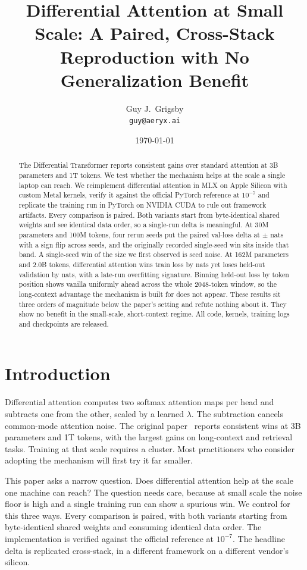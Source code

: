 \documentclass[11pt]{article}
\title{Differential Attention at Small Scale: A Paired, Cross-Stack
Reproduction with No Generalization Benefit}
\author{Guy J.\ Grigsby\\\small\texttt{guy@aeryx.ai}}
\date{\today}
\begin{document}
\maketitle

\begin{abstract}
The Differential Transformer reports consistent gains over standard
attention at 3B parameters and 1T tokens. We test whether the mechanism
helps at the scale a single laptop can reach. We reimplement
differential attention in MLX on Apple Silicon with custom Metal
kernels, verify it against the official PyTorch reference at $10^{-7}$ 
and replicate the training run in PyTorch on NVIDIA CUDA to rule out
framework artifacts. Every comparison is paired. Both variants start
from byte-identical shared weights and see identical data order, so a
single-run delta is meaningful. At 30M parameters and 100M tokens, four
rerun seeds put the paired val-loss delta at \StageZeroMeanDelta{}
$\pm$ \StageZeroStdDelta{} nats with a sign flip across seeds, and the
originally recorded single-seed win sits inside that band. A
single-seed win of the size we first observed is seed noise. At 162M
parameters and 2.0B tokens, differential attention wins train loss by
\StageOneTrainDeltaSigned{} nats yet loses held-out validation by
\StageOneValDeltaSigned{} nats, with a late-run overfitting signature.
Binning held-out loss by token position shows vanilla uniformly ahead
across the whole 2048-token window, so the long-context advantage the
mechanism is built for does not appear. These results sit three orders
of magnitude below the paper's setting and refute nothing about it.
They show no benefit in the small-scale, short-context regime. All
code, kernels, training logs and checkpoints are released.
\end{abstract}

\section{Introduction}
Differential attention computes two softmax attention maps per head and
subtracts one from the other, scaled by a learned $\lambda$. The
subtraction cancels common-mode attention noise. The original
paper~\cite{ye2025differential} reports consistent wins at 3B
parameters and 1T tokens, with the largest gains on long-context and
retrieval tasks. Training at that scale requires a cluster. Most
practitioners who consider adopting the mechanism will first try it far
smaller.

This paper asks a narrow question. Does differential attention help at
the scale one machine can reach? The question needs care, because at
small scale the noise floor is high and a single training run can show
a spurious win. We control for this three ways. Every
comparison is paired, with both variants starting from byte-identical
shared weights and consuming identical data order. The implementation
is verified against the official reference at $10^{-7}$. The headline
delta is replicated cross-stack, in a different framework on a
different vendor's silicon.
\end{document}
